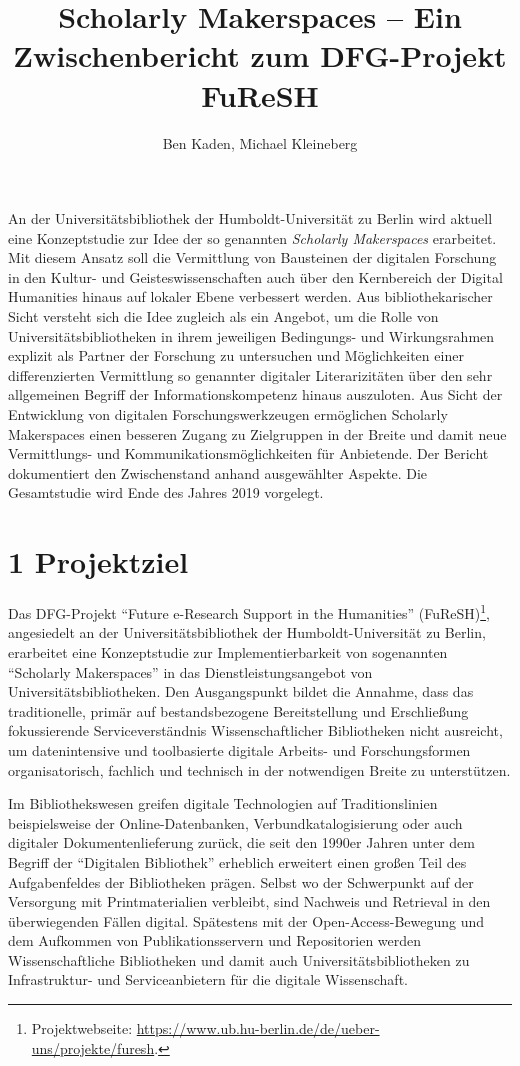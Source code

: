 \documentclass[a4paper,
fontsize=11pt,
oneside,
numbers=noperiodatend,
parskip=half-,
bibliography=totoc,
final
]{scrartcl}
\title{\LARGE{Scholarly Makerspaces -- Ein Zwischenbericht zum DFG-Projekt FuReSH}}%
\author{Ben Kaden, Michael Kleineberg} %
\date{}
\begin{document}
\maketitle
\thispagestyle{fancyplain} 


An der Universitätsbibliothek der Humboldt-Universität zu Berlin wird
aktuell eine Konzeptstudie zur Idee der so genannten \emph{Scholarly
Makerspaces} erarbeitet. Mit diesem Ansatz soll die Vermittlung von
Bausteinen der digitalen Forschung in den Kultur- und
Geisteswissenschaften auch über den Kernbereich der Digital Humanities
hinaus auf lokaler Ebene verbessert werden. Aus bibliothekarischer Sicht
versteht sich die Idee zugleich als ein Angebot, um die Rolle von
Universitätsbibliotheken in ihrem jeweiligen Bedingungs- und
Wirkungsrahmen explizit als Partner der Forschung zu untersuchen und
Möglichkeiten einer differenzierten Vermittlung so genannter digitaler
Literarizitäten über den sehr allgemeinen Begriff der
Informationskompetenz hinaus auszuloten. Aus Sicht der Entwicklung von
digitalen Forschungswerkzeugen ermöglichen Scholarly Makerspaces einen
besseren Zugang zu Zielgruppen in der Breite und damit neue
Vermittlungs- und Kommunikationsmöglichkeiten für Anbietende. Der
Bericht dokumentiert den Zwischenstand anhand ausgewählter Aspekte. Die
Gesamtstudie wird Ende des Jahres 2019 vorgelegt.

\hypertarget{projektziel}{%
\section{1 Projektziel}\label{projektziel}}

Das DFG-Projekt \enquote{Future e-Research Support in the Humanities}
(FuReSH)\footnote{Projektwebseite:
  \url{https://www.ub.hu-berlin.de/de/ueber-uns/projekte/furesh}.},
angesiedelt an der Universitätsbibliothek der Humboldt-Universität zu
Berlin, erarbeitet eine Konzeptstudie zur Implementierbarkeit von
sogenannten \enquote{Scholarly Makerspaces} in das
Dienstleistungsangebot von Universitätsbibliotheken. Den Ausgangspunkt
bildet die Annahme, dass das traditionelle, primär auf bestandsbezogene
Bereitstellung und Erschließung fokussierende Serviceverständnis
Wissenschaftlicher Bibliotheken nicht ausreicht, um datenintensive und
toolbasierte digitale Arbeits- und Forschungsformen organisatorisch,
fachlich und technisch in der notwendigen Breite zu unterstützen.

Im Bibliothekswesen greifen digitale Technologien auf Traditionslinien
beispielsweise der Online-Datenbanken, Verbundkatalogisierung oder auch
digitaler Dokumentenlieferung zurück, die seit den 1990er Jahren unter
dem Begriff der \enquote{Digitalen Bibliothek} erheblich erweitert einen
großen Teil des Aufgabenfeldes der Bibliotheken prägen. Selbst wo der
Schwerpunkt auf der Versorgung mit Printmaterialien verbleibt, sind
Nachweis und Retrieval in den überwiegenden Fällen digital. Spätestens
mit der Open-Access-Bewegung und dem Aufkommen von Publikationsservern
und Repositorien werden Wissenschaftliche Bibliotheken und damit auch
Universitätsbibliotheken zu Infrastruktur- und Serviceanbietern für die
digitale Wissenschaft.
\end{document}
